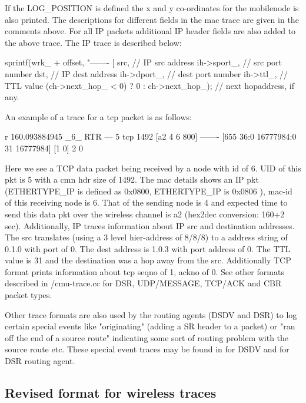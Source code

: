 If the LOG\_POSITION is defined the x and y co-ordinates for the
mobilenode is also printed. The descriptions for different fields in the
mac trace are given in the comments above. For all IP packets additional
IP header fields are also added to the above trace. The IP trace is
described below:

\begin{program}
sprintf(wrk_ + offset, "------- [%
		src,          // IP src address
		ih->sport_,   // src port number
		dst,          // IP dest address
		ih->dport_,   // dest port number
		ih->ttl_,     // TTL value 
		(ch->next_hop_ < 0) ? 0 : ch->next_hop_); // next hopaddress, if any.
\end{program}

An example of a trace for a tcp packet is as follows:
\begin{program}
r 160.093884945 _6_ RTR  --- 5 tcp 1492 [a2 4 6 800] ------- [655
36:0 16777984:0 31 16777984] [1 0] 2 0
\end{program}
Here we see a TCP data packet being received by a node with id of 6. UID
of this pkt is 5 with a cmn hdr size of 1492. The mac details shows an IP
pkt (ETHERTYPE\_IP is defined as 0x0800, ETHERTYPE\_IP is 0x0806 ), mac-id
of this receiving node is 6. That of the sending node is 4 and expected
time to send this data pkt over the wireless channel is a2 (hex2dec
conversion: 160+2 sec). Additionally, IP traces information about IP src
and destination addresses. The src translates (using a 3 level
hier-address of 8/8/8) to a address string of 0.1.0 with port of 0. The
dest address is 1.0.3 with port address of 0. The TTL value is 31 and the
destination was a hop away from the src. Additionally TCP format prints
information about tcp seqno of 1, ackno of 0. See other formats described
in \nsf/cmu-trace.cc for DSR, UDP/MESSAGE, TCP/ACK and CBR packet types.

Other trace formats are also used by the routing agents (DSDV and DSR) to
log certain special events like "originating" (adding a SR header to a
packet) or  "ran off the end of a source route" indicating some sort of
routing problem with the source route etc. These special event traces may
be found in  for DSDV and  for DSR
routing agent.


\subsection{Revised format for wireless traces}
\label{sec:revtraceformat}

